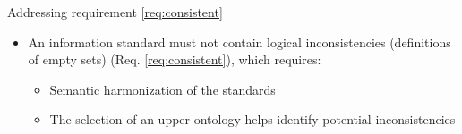 \begin{frame}{Addressing requirement \ref{req:consistent}}
\begin{itemize} 
\item An information standard must not contain logical inconsistencies (definitions of empty sets) (Req. \ref{req:consistent}), which requires:
\begin{itemize}
    \item Semantic harmonization of the standards
    \item The selection of an upper ontology helps identify potential inconsistencies
\end{itemize}

\end{itemize}

\end{frame}